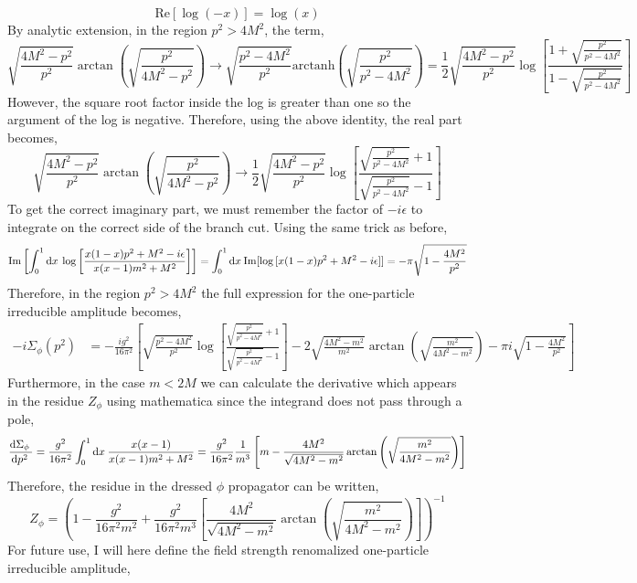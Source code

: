 \documentclass{article}
\begin{document}
\[ \mathrm{Re}[\log{(-x)}] = \log{(x)} \]
By analytic extension, in the region $p^2  > 4 M^2$, the term,
\[\sqrt{\frac{4 M^2 - p^2}{p^2}} \arctan{\left(\sqrt{\frac{p^2}{4 M^2 - p^2}}\right)} \to \sqrt{\frac{p^2 - 4 M^2}{p^2}} \mathrm{arctanh}{\left(\sqrt{\frac{p^2}{p^2 - 4 M^2}}\right)} = \frac{1}{2} \sqrt{\frac{4 M^2 - p^2}{p^2}} \log{\left[ \frac{1 + \sqrt{\frac{p^2}{p^2 - 4 M^2}}}{1 - \sqrt{\frac{p^2}{p^2 - 4 M^2}}} \right]}\]
However, the square root factor inside the log is greater than one so the argument of the log is negative. Therefore, using the above identity, the real part becomes,
\[\sqrt{\frac{4 M^2 - p^2}{p^2}} \arctan{\left(\sqrt{\frac{p^2}{4 M^2 - p^2}}\right)} \to \frac{1}{2} \sqrt{\frac{4 M^2 - p^2}{p^2}} \log{\left[ \frac{\sqrt{\frac{p^2}{p^2 - 4 M^2}} + 1}{\sqrt{\frac{p^2}{p^2 - 4 M^2}} - 1} \right]}\]
To get the correct imaginary part, we must remember the factor of $-i \epsilon$ to integrate on the correct side of the branch cut. Using the same trick as before,  
\[ \mathrm{Im} \left[ \int_{0}^{1} \mathrm{d}x \: \log{\left[\frac{x(1 - x) p^2 + M^2 - i \epsilon}{x(x - 1) m^2 + M^2} \right]} \right]  = \int_{0}^{1} \mathrm{d}x \: \mathrm{Im}[\log{[x(1 - x) p^2 + M^2 - i \epsilon]}] = - \pi \sqrt{1 - \frac{4 M^2}{p^2}} \]
Therefore, in the region $p^2 > 4 M^2$ the full expression for the one-particle irreducible amplitude becomes,
\begin{align*}
- i \Sigma_\phi(p^2) 
& = - \frac{ig^2}{16 \pi^2} \left[ \sqrt{\frac{p^2 - 4 M^2}{p^2}} \log{\left[ \frac{\sqrt{\frac{p^2}{p^2 - 4 M^2}} + 1}{\sqrt{\frac{p^2}{p^2 - 4 M^2}} - 1} \right]} - 2 \sqrt{\frac{4 M^2 - m^2}{m^2}} \arctan{\left(\sqrt{\frac{m^2}{4 M^2 - m^2}}\right)} - \pi i \sqrt{1 - \frac{4 M^2}{p^2}} \right]
\end{align*}
Furthermore, in the case $m < 2M$ we can calculate the derivative which appears in the residue $Z_\phi$ using mathematica since the integrand does not pass through a pole,
\[ \frac{\mathrm{d}\Sigma_\phi \:}{\mathrm{d}p^2 \:} = \frac{g^2}{16 \pi^2} \int_{0}^1 \mathrm{d}x \: \frac{x(x-1)}{x(x-1)m^2 + M^2} 
=
\frac{g^2}{16 \pi^2} \frac{1}{m^3} \left[ m - \frac{4 M^2}{\sqrt{4 M^2 - m^2}} \arctan{\left( \sqrt{\frac{m^2}{4 M^2 - m^2}} \right)} \right] \]
Therefore, the residue in the dressed $\phi$ propagator can be written,
\[ Z_\phi = \left( 1 - \frac{g^2}{16 \pi^2 m^2} + \frac{g^2}{16 \pi^2 m^3} \left[ \frac{4 M^2}{\sqrt{4 M^2 - m^2}} \arctan{\left( \sqrt{\frac{m^2}{4 M^2 - m^2}} \right)} \right]  \right)^{-1} \]
For future use, I will here define the field strength renomalized one-particle irreducible amplitude,
\end{document}

